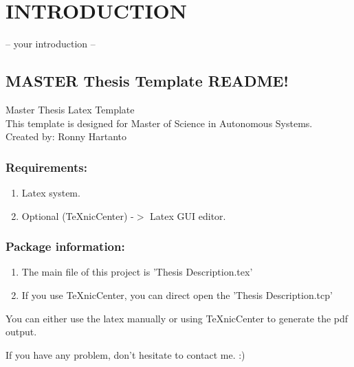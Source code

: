 
\chapter{INTRODUCTION}

-- your introduction --

\section{MASTER Thesis Template README!}

\begin{flushleft}
Master Thesis Latex Template \\
This template is designed for Master of Science in Autonomous Systems. \\
Created by: Ronny Hartanto
\end{flushleft}

\subsection{Requirements:}
\begin{enumerate}
	\item Latex system.
	\item Optional (TeXnicCenter) -$>$ Latex GUI editor.
\end{enumerate}

\subsection{Package information:}
\begin{enumerate}
	\item The main file of this project is 'Thesis Description.tex'
	\item If you use TeXnicCenter, you can direct open the 'Thesis Description.tcp'
\end{enumerate}

\begin{flushleft}
You can either use the latex manually or using TeXnicCenter to generate the pdf output.

If you have any problem, don't hesitate to contact me. :)
\end{flushleft}

